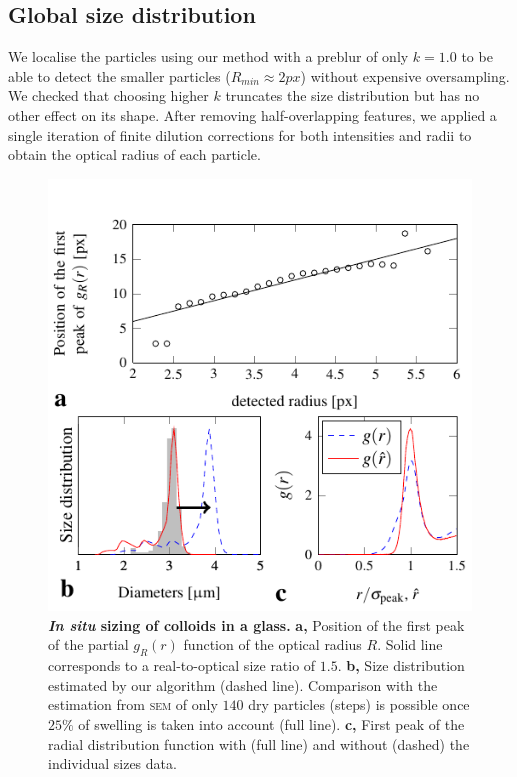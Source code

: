 \documentclass[8.5pt,twoside,twocolumn]{article}
\begin{document}
\subsection{Global size distribution}

We localise the particles using our method with a preblur of only $k=1.0$ to be able to detect the smaller particles ($R_{min}\approx \unit{2}{px}$) without expensive oversampling. We checked that choosing higher $k$ truncates the size distribution but has no other effect on its shape. After removing half-overlapping features, we applied a single iteration of finite dilution corrections for both intensities and radii to obtain the optical radius of each particle.

\begin{figure}
\centering
\includegraphics{fig_sizing.pdf}
	\caption{\textbf{\emph{In situ} sizing of colloids in a glass.} \textbf{a,} Position of the first peak of the partial $g_R(r)$ function of the optical radius $R$. Solid line corresponds to a real-to-optical size ratio of $1.5$. \textbf{b,} Size distribution estimated by our algorithm (dashed line). Comparison with the estimation from \textsc{sem} of only $140$ dry particles (steps) is possible once $25\%$ of swelling is taken into account (full line). \textbf{c,} First peak of the radial distribution function with (full line) and without (dashed) the individual sizes data.}
	\label{fig:sizing}
\end{figure}
\end{document}
